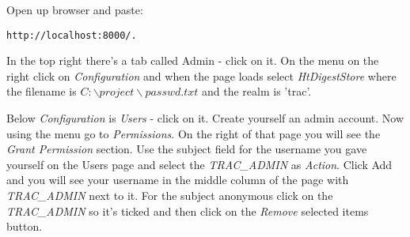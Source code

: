\documentclass{report}
\begin{document}
Open up browser and paste:
\begin{verbatim}
http://localhost:8000/. 
\end{verbatim}

In the top right there's a tab called Admin - click on it. On the menu on the right
click on \textit{Configuration} and when the page loads select \textit{HtDigestStore}
where the filename is $C:\backslash project\backslash passwd.txt$ and the realm is 'trac'.

Below \textit{Configuration} is \textit{Users} - click on it. Create yourself 
an admin account. Now using the menu go to \textit{Permissions}. On the right 
of that page you will see the \textit{Grant Permission} section. Use the subject 
field for the username you gave yourself on the Users page and select the \textit{TRAC\_ADMIN} as
\textit{Action}. Click Add and you will see your username in the middle column of the page with 
\textit{TRAC\_ADMIN} next to it. For the subject anonymous click on the \textit{TRAC\_ADMIN} 
so it's ticked and then click on the \textit{Remove} selected items button.
\end{document}
